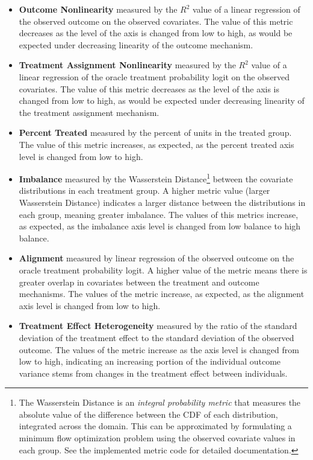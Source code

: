 \documentclass[../main.tex]{subfiles}
\begin{document}
\begin{itemize}
    \item \textbf{Outcome Nonlinearity} measured by the $R^2$ value of a linear regression of the observed outcome on the observed covariates. The value of this metric decreases as the level of the axis is changed from low to high, as would be expected under decreasing linearity of the outcome mechanism.
    
    \item \textbf{Treatment Assignment Nonlinearity} measured by the $R^2$ value of a linear regression of the oracle treatment probability logit on the observed covariates. The value of this metric decreases as the level of the axis is changed from low to high, as would be expected under decreasing linearity of the treatment assignment mechanism.
    
    \item \textbf{Percent Treated} measured by the percent of units in the treated group. The value of this metric increases, as expected, as the percent treated axis level is changed from low to high.
    
    \item \textbf{Imbalance} measured by the Wasserstein Distance\footnote{The Wasserstein Distance is an \textit{integral probability metric} that measures the absolute value of the difference between the CDF of each distribution, integrated across the domain. This can be approximated by formulating a minimum flow optimization problem using the observed covariate values in each group. See the implemented metric code for detailed documentation.} between the covariate distributions in each treatment group. A higher metric value (larger Wasserstein Distance) indicates a larger distance between the distributions in each group, meaning greater imbalance. The values of this metrics increase, as expected, as the imbalance axis level is changed from low balance to high balance. 
    
    \item \textbf{Alignment} measured by linear regression of the observed outcome on the oracle treatment probability logit. A higher value of the metric means there is greater overlap in covariates between the treatment and outcome mechanisms. The values of the metric increase, as expected, as the alignment axis level is changed from low to high.
    
    \item \textbf{Treatment Effect Heterogeneity} measured by the ratio of the standard deviation of the treatment effect to the standard deviation of the observed outcome. The values of the metric increase as the axis level is changed from low to high, indicating an increasing portion of the individual outcome variance stems from changes in the treatment effect between individuals.
\end{itemize}
\end{document}
